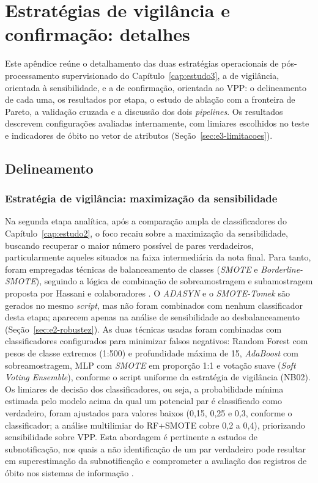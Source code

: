 \chapter{Estratégias de vigilância e confirmação: detalhes}\label{ap:estrategias}

Este apêndice reúne o detalhamento das duas estratégias operacionais de pós-processamento supervisionado do Capítulo~\ref{cap:estudo3}, a de vigilância, orientada à sensibilidade, e a de confirmação, orientada ao VPP: o delineamento de cada uma, os resultados por etapa, o estudo de ablação com a fronteira de Pareto, a validação cruzada e a discussão dos dois \textit{pipelines}. Os resultados descrevem configurações avaliadas internamente, com limiares escolhidos no teste e indicadores de óbito no vetor de atributos (Seção~\ref{sec:e3-limitacoes}).

\section{Delineamento}\label{sec:e3-ap-delineamento}

\subsection{Estratégia de vigilância: maximização da sensibilidade}\label{sec:estrategia-recall}

Na segunda etapa analítica, após a comparação ampla de classificadores do Capítulo~\ref{cap:estudo2}, o foco recaiu sobre a maximização da sensibilidade, buscando recuperar o maior número possível de pares verdadeiros, particularmente aqueles situados na faixa intermediária da nota final. Para tanto, foram empregadas técnicas de balanceamento de classes (\textit{SMOTE} \cite{Chawla2002smote} e \textit{Borderline-SMOTE}), seguindo a lógica de combinação de sobreamostragem e subamostragem proposta por Hassani e colaboradores \citeyearpar{Hassani2025oversampling}. O \textit{ADASYN} e o \textit{SMOTE-Tomek} são gerados no mesmo \textit{script}, mas não foram combinados com nenhum classificador desta etapa; aparecem apenas na análise de sensibilidade ao desbalanceamento (Seção~\ref{sec:e2-robustez}). As duas técnicas usadas foram combinadas com classificadores configurados para minimizar falsos negativos: Random Forest com pesos de classe extremos (1:500) e profundidade máxima de 15, \textit{AdaBoost} com sobreamostragem, MLP com \textit{SMOTE} em proporção 1:1 e votação suave (\textit{Soft Voting Ensemble}), conforme o script uniforme da estratégia de vigilância (NB02). Os limiares de decisão dos classificadores, ou seja, a probabilidade mínima estimada pelo modelo acima da qual um potencial par é classificado como verdadeiro, foram ajustados para valores baixos (0{,}15, 0{,}25 e 0{,}3, conforme o classificador; a análise multilimiar do RF+SMOTE cobre 0{,}2 a 0{,}4), priorizando sensibilidade sobre VPP. Esta abordagem é pertinente a estudos de subnotificação, nos quais a não identificação de um par verdadeiro pode resultar em superestimação da subnotificação e comprometer a avaliação dos registros de óbito nos sistemas de informação \cite{Oliveira2012uso, Sousa2011obitos}.

